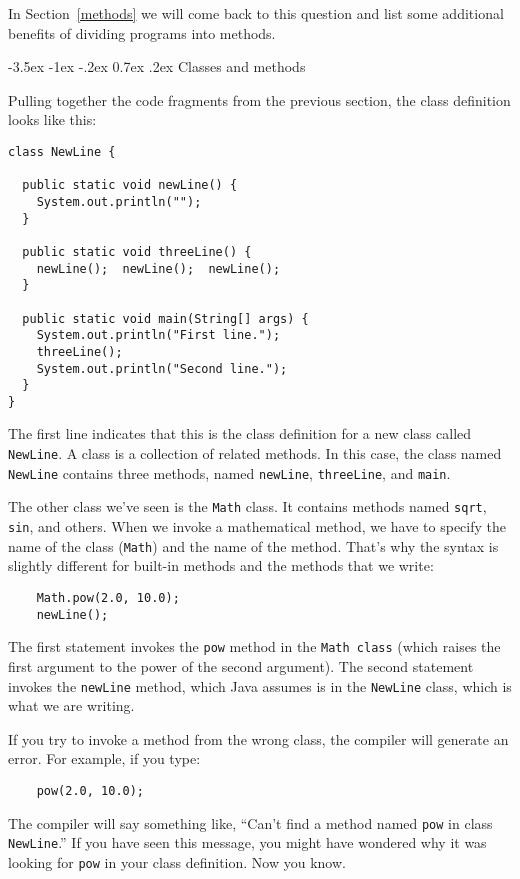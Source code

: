 \documentclass{book}
\makeatletter
\renewcommand{\section}{\@startsection 
    {section} {1} {0mm}%
    {-3.5ex \@plus -1ex \@minus -.2ex}%
    {0.7ex \@plus.2ex}%
    {\normalfont\Large\bfseries}}
\makeatother
\begin{document}
In Section~\ref{methods} we will come back to this question and list
some additional benefits of dividing programs into methods.


\section{Classes and methods}

Pulling together the code fragments from the previous
section, the class definition looks like this:

\begin{verbatim}
class NewLine {

  public static void newLine() {
    System.out.println("");
  }

  public static void threeLine() {
    newLine();  newLine();  newLine();
  }

  public static void main(String[] args) {
    System.out.println("First line.");
    threeLine();
    System.out.println("Second line.");
  }
}
\end{verbatim}
%
The first line indicates that this is the class definition for a new
class called {\tt NewLine}.  A class is a collection of related
methods.  In this case, the class named {\tt NewLine} contains three
methods, named {\tt newLine}, {\tt threeLine}, and {\tt main}.

The other class we've seen is the {\tt Math} class.  It contains
methods named {\tt sqrt}, {\tt sin}, and others.  When
we invoke a mathematical method, we have to specify
the name of the class ({\tt Math}) and the name of the method.
That's why the syntax is slightly different for built-in
methods and the methods that we write:

\begin{verbatim}
    Math.pow(2.0, 10.0);
    newLine();
\end{verbatim}
%
The first statement invokes the {\tt pow} method in
the {\tt Math class} (which raises the first argument to the
power of the second argument).  The second statement invokes
the {\tt newLine} method, which Java assumes 
is in the {\tt NewLine} class, which is what we are writing.

If you try to invoke a method from the wrong class, the
compiler will generate an error.  For example, if you
type:

\begin{verbatim}
    pow(2.0, 10.0);
\end{verbatim}
%
The compiler will say something like, ``Can't find a method
named {\tt pow} in class {\tt NewLine}.''  If you have
seen this message, you might have wondered why it was looking
for {\tt pow} in your class definition.  Now you know.
\end{document}
